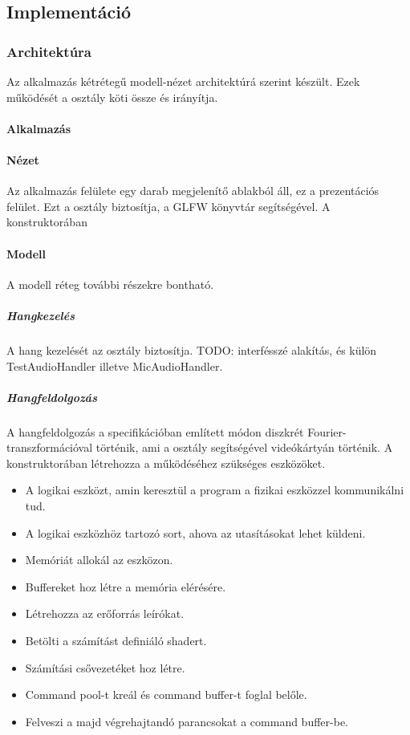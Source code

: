 
\subsection{Implement\'aci\'o}

\subsubsection{Architekt\'ura}
Az alkalmaz\'as k\'etr\'eteg\H u modell-n\'ezet architekt\'ur\'a szerint k\'esz\"ult.
Ezek m\H uk\"od\'es\'et a  oszt\'aly k\"oti \"ossze \'es ir\'any\'itja.

\paragraph{Alkalmaz\'as}


\paragraph{N\'ezet}
Az alkalmaz\'as fel\"ulete egy darab megjelen\'it\H o ablakb\'ol \'all, ez a prezent\'aci\'os fel\"ulet.
Ezt a  oszt\'aly biztos\'itja, a GLFW k\"onyvt\'ar seg\'its\'eg\'evel.
A konstruktor\'aban %

\paragraph{Modell}
A modell r\'eteg tov\'abbi r\'eszekre bonthat\'o.

\subparagraph{Hangkezel\'es}
A hang kezel\'es\'et az  oszt\'aly biztos\'itja.
TODO: interf\'essz\'e alak\'it\'as, \'es k\"ul\"on TestAudioHandler illetve MicAudioHandler.

\subparagraph{Hangfeldolgoz\'as}
A hangfeldolgoz\'as a specifik\'aci\'oban eml\'itett m\'odon diszkr\'et Fourier-transzform\'aci\'oval t\"ort\'enik, ami a  oszt\'aly seg\'its\'eg\'evel vide\'ok\'arty\'an t\"ort\'enik.
A konstruktor\'aban l\'etrehozza a m\H uk\"od\'es\'ehez sz\"uks\'eges eszk\"oz\"oket. 
\begin{itemize}
	\item A logikai eszk\"ozt, amin kereszt\"ul a program a fizikai eszk\"ozzel kommunik\'alni tud.
	\item A logikai eszk\"ozh\"oz tartoz\'o sort, ahova az utas\'it\'asokat lehet k\"uldeni.
	\item Mem\'ori\'at allok\'al az eszk\"ozon.
	\item Buffereket hoz l\'etre a mem\'oria el\'er\'es\'ere.
	\item L\'etrehozza az er\H oforr\'as le\'ir\'okat.
	\item Bet\"olti a sz\'am\'it\'ast defini\'al\'o shadert.
	\item Sz\'am\'it\'asi cs\H ovezet\'eket hoz l\'etre.
	\item Command pool-t kre\'al \'es command buffer-t foglal bel\H ole.
	\item Felveszi a majd v\'egrehajtand\'o parancsokat a command buffer-be.
\end{itemize}

